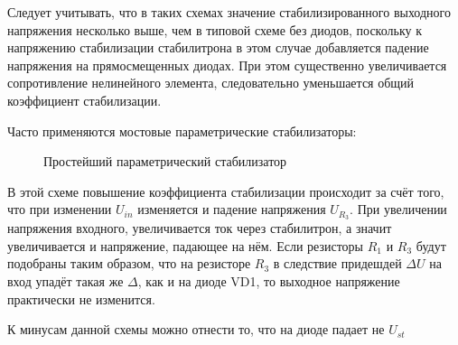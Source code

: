 Следует учитывать, что в таких схемах значение стабилизированного выходного напряжения несколько выше, чем в типовой схеме без диодов, поскольку к напряжению стабилизации стабилитрона в этом случае добавляется падение напряжения на прямосмещенных диодах. При этом существенно увеличивается сопротивление нелинейного элемента, следовательно уменьшается общий коэффициент стабилизации.

Часто применяются мостовые параметрические стабилизаторы:
\begin{center}
	\begin{figure}[h!]
		\caption{Простейший параметрический стабилизатор}
	\end{figure}
\end{center}

В этой схеме повышение коэффициента стабилизации происходит за счёт того, что при изменении $U_{in}$ изменяется и падение напряжения $U_{R_3}$.
При увеличении напряжения входного, увеличивается ток через стабилитрон, а значит увеличивается и напряжение, падающее на нём. Если резисторы $R_1$ и $R_3$ будут подобраны таким образом, что на резисторе $R_3$ в следствие придешдей $\Delta U$ на вход упадёт такая же $\Delta$, как и на диоде VD1, то выходное напряжение практически не изменится.

К минусам данной схемы можно отнести то, что на диоде падает не $U_{st}$

